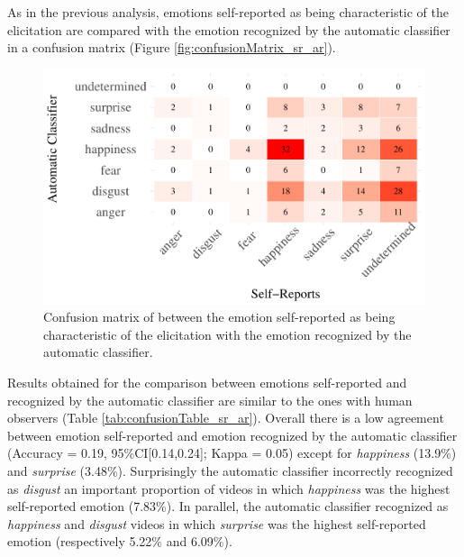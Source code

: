 \documentclass[conference,final,]{IEEEtran}
\makeatletter
\def\maxwidth{\ifdim\Gin@nat@width>\linewidth\linewidth
\else\Gin@nat@width\fi}
\let\Oldincludegraphics\includegraphics
\renewcommand{\includegraphics}[1]{\Oldincludegraphics[width=\maxwidth]{#1}}
\makeatother
\begin{document}
As in the previous analysis, emotions self-reported as being
characteristic of the elicitation are compared with the emotion
recognized by the automatic classifier in a confusion matrix (Figure
\ref{fig:confusionMatrix_sr_ar}).

\begin{figure}
\centering
\includegraphics{ACII_2019_paper_files/figure-latex/confusionMatrix_sr_ar-1.pdf}
\caption{Confusion matrix of between the emotion self-reported as being
characteristic of the elicitation with the emotion recognized by the
automatic classifier.}
\end{figure}

Results obtained for the comparison between emotions self-reported and
recognized by the automatic classifier are similar to the ones with
human observers (Table \ref{tab:confusionTable_sr_ar}). Overall there is
a low agreement between emotion self-reported and emotion recognized by
the automatic classifier (Accuracy = 0.19, 95\%CI{[}0.14,0.24{]}; Kappa
= 0.05) except for \emph{happiness} (13.9\%) and \emph{surprise}
(3.48\%). Surprisingly the automatic classifier incorrectly recognized
as \emph{disgust} an important proportion of videos in which
\emph{happiness} was the highest self-reported emotion (7.83\%). In
parallel, the automatic classifier recognized as \emph{happiness} and
\emph{disgust} videos in which \emph{surprise} was the highest
self-reported emotion (respectively 5.22\% and 6.09\%).
\end{document}
